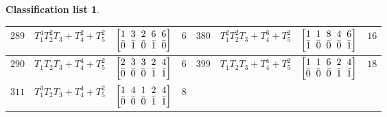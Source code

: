 \documentclass[pdftex]{sigma}%
\theoremstyle{definition}
\newtheorem{class-list}[thm]{Classification list}
\numberwithin{equation}{section}
\begin{document}
\begin{class-list}
\begin{table}[h!]
\begin{tabu}{c|c|c|c||c|c|c|c}
\\
\hline
${289}$&${T_{1}^{4}T_{2}^{2}T_{3}+T_{4}^{2}+T_{5}^{2}}$
&$\arraycolsep=1mm\begin{bmatrix}{1} & {3} & {2} & {6} & {6} \\ {\bar{0}} & {\bar{1}} & {\bar{0}} & {\bar{1}} & {\bar{0}}\end{bmatrix}$&${6}$
&${380}$&${T_{1}^{2}T_{2}^{2}T_{3}+T_{4}^{3}+T_{5}^{2}}$
&$\arraycolsep=1mm\begin{bmatrix}{1} & {1} & {8} & {4} & {6} \\ {\bar{1}} & {\bar{0}} & {\bar{0}} & {\bar{0}} & {\bar{1}}\end{bmatrix}$&${16}$
\\
\hline
${290}$&${T_{1}T_{2}T_{3}+T_{4}^{4}+T_{5}^{2}}$
&$\arraycolsep=1mm\begin{bmatrix}{2} & {3} & {3} & {2} & {4} \\ {\bar{0}} & {\bar{0}} & {\bar{0}} & {\bar{1}} & {\bar{1}}\end{bmatrix}$&${6}$
&${399}$&${T_{1}T_{2}T_{3}+T_{4}^{4}+T_{5}^{2}}$
&$\arraycolsep=1mm\begin{bmatrix}{1} & {1} & {6} & {2} & {4} \\ {\bar{0}} & {\bar{0}} & {\bar{0}} & {\bar{1}} & {\bar{1}}\end{bmatrix}$&${18}$\\
\hline
${311}$&${T_{1}^{3}T_{2}T_{3}+T_{4}^{4}+T_{5}^{2}}$
&$\arraycolsep=1mm\begin{bmatrix}{1} & {4} & {1} & {2} & {4} \\ {\bar{0}} & {\bar{0}} & {\bar{0}} & {\bar{1}} & {\bar{1}}\end{bmatrix}$&${8}$
\\
\end{tabu}%
\end{table}
\end{class-list}

\newpage
\end{document}
